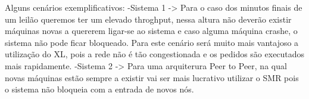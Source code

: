 \documentclass[times, 10pt,twocolumn]{article}
\begin{document}
Alguns cenários exemplificativos:
-Sistema 1 -> Para o caso dos minutos finais de um leilão queremos ter um elevado throghput, nessa altura não deverão existir máquinas novas a 
quererem ligar-se ao sistema e caso alguma máquina crashe, o sistema não pode ficar bloqueado. Para este cenário será muito mais vantajoso a 
utilização do XL, pois a rede não é tão congestionada e os pedidos são executados mais rapidamente. 
-Sistema 2 -> Para uma arquiterura Peer to Peer, na qual novas máquinas estão sempre a existir vai ser mais lucrativo utilizar o SMR pois o sistema
não bloqueia com a entrada de novos nós.

\nocite{ex1,ex2}


\end{document}
